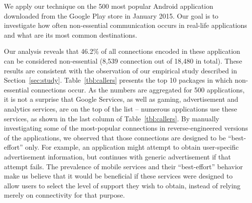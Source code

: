 We apply our technique on the 500 most popular Android application
downloaded from the Google Play store in January 2015.  Our goal is to
investigate how often non-essential communication occurs in real-life
applications and what are its most common destinations.


Our analysis reveals that 46.2\% of all connections encoded in these application can be considered non-essential (8,539 connection out of 18,480 in total).
These results are consistent with the observation of our empirical study described in Section~\ref{sec:study}.
Table~\ref{tbl:callers} presents the top 10 packages in which
non-essential connections occur.  As the numbers are aggregated for
500 applications, it is not a surprise that Google Services, as well
as gaming, advertisement and analytics services, are on the top of the
list -- numerous applications use these services, as shown in the last
column of Table~\ref{tbl:callers}.  By manually investigating some of
the most-popular connections in reverse-engineered versions of the
applications, we observed that those connections are designed to be
``best-effort'' only. For example, an application might attempt to
obtain user-specific advertisement information, but continues with
generic advertisement if that attempt fails.  The prevalence of mobile
services and their ``best-effort'' behavior make us believe that it
would be beneficial if these services were designed to allow users to
select the level of support they wish to obtain, instead of relying
merely on connectivity for that purpose.

